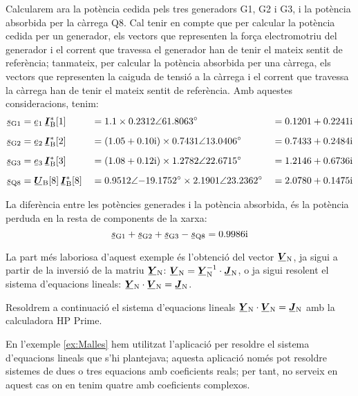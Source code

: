 \begin{exemple}
    Calcularem ara la potència cedida pels tres generadors G1, G2 i G3, i la potència absorbida per la càrrega Q8. Cal tenir en compte que per calcular la potència cedida per un generador, els vectors que representen la força electromotriu del generador i el corrent que travessa el generador han de tenir el mateix sentit de referència; tanmateix, per calcular la potència absorbida per una càrrega, els vectors que representen la caiguda de tensió a la càrrega i el corrent que travessa la càrrega han de tenir el mateix sentit de referència. Amb aquestes consideracions, tenim:
    \begin{alignat*}{3}
       \cmplx{s}\ped{G1} &= \cmplx{e}\ped{1} \, \mcmplx{I}\ped{B}^*[1] &&= \num{1,1} \times
        \complexnum{0,2312:61,8063} &&= \complexnum{0,1201 + j 0,2241} \\[2mm]
       \cmplx{s}\ped{G2} &= \cmplx{e}\ped{2} \, \mcmplx{I}\ped{B}^*[2] &&=
       (\complexnum{1,05 + j 0,10}) \times \complexnum{0,7431:13,0406} &&=
       \complexnum{0,7433 + j 0,2484} \\[2mm]
       \cmplx{s}\ped{G3} &= \cmplx{e}\ped{3} \, \mcmplx{I}\ped{B}^*[3] &&=
       (\complexnum{1,08 + j 0,12}) \times \complexnum{1,2782:22,6715} &&=
       \complexnum{1,2146 + j 0,6736}  \\[2mm]
       \cmplx{s}\ped{Q8} &= \mcmplx{U}\ped{B}[8] \, \mcmplx{I}\ped{B}^*[8] &&=
      \complexnum{0,9512:-19,1752} \times \complexnum{2,1901:23,2362}    &&=
      \complexnum{2,0780 + j 0,1475}
    \end{alignat*}

    La diferència entre les potències generades i la potència absorbida, és la potència perduda en la resta de components de la xarxa:
    \[
       \cmplx{s}\ped{G1} + \cmplx{s}\ped{G2} + \cmplx{s}\ped{G3} -
       \cmplx{s}\ped{Q8} = \complexnum{j 0,9986}
    \]

    La part més laboriosa d'aquest exemple és l'obtenció del vector $\mcmplx{V}\ped{N}$, ja sigui a partir de la inversió de la matriu $\mcmplx{Y}\ped{N}$: $\mcmplx{V}\ped{N} = \mcmplx{Y}\ped{N}^{-1} \cdot \mcmplx{J}\ped{N}$, o ja sigui  resolent el sistema d'equacions lineals: $\mcmplx{Y}\ped{N} \cdot \mcmplx{V}\ped{N} = \mcmplx{J}\ped{N}$.

    Resoldrem a continuació el sistema d'equacions lineals $\mcmplx{Y}\ped{N} \cdot \mcmplx{V}\ped{N} = \mcmplx{J}\ped{N}$ amb la calculadora \textsf{HP Prime}.

    En l'exemple \vref{ex:Malles} hem utilitzat l'aplicació  per resoldre el sistema d'equacions lineals que s'hi plantejava;  aquesta aplicació només pot resoldre sistemes de dues o tres equacions amb coeficients reals;  per tant, no serveix en aquest cas on en tenim quatre amb coeficients complexos.


\end{exemple}
